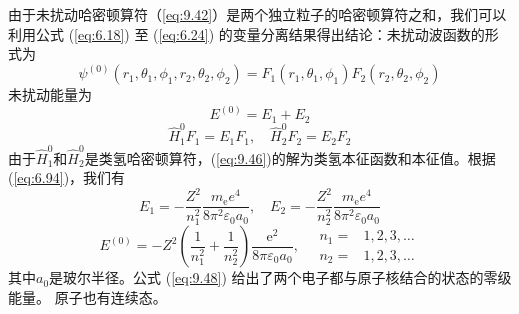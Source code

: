     由于未扰动哈密顿算符（\ref{eq:9.42}）是两个独立粒子的哈密顿算符之和，我们可以利用公式 (\ref{eq:6.18}) 至 (\ref{eq:6.24}) 的变量分离结果得出结论：未扰动波函数的形式为
    \begin{equation}
        \psi^{\left(0\right)}\left(r_1,\theta_1,\phi_1,r_2,\theta_2,\phi_2\right) = F_1\left(r_1,\theta_1,\phi_1\right) F_2\left(r_2,\theta_2,\phi_2\right)
        \label{eq:9.44}
    \end{equation}
    未扰动能量为
    \begin{equation}
        E^{\left(0\right)} = E_1 + E_2
        \label{eq:9.45}
    \end{equation}
    \begin{equation}
        \hat{H}_1^0 F_1 = E_1 F_1, \quad \hat{H}_2^0 F_2 = E_2 F_2
        \label{eq:9.46}
    \end{equation}
    由于$\hat{H}_1^0$和$\hat{H}_2^0$是类氢哈密顿算符，(\ref{eq:9.46})的解为类氢本征函数和本征值。根据(\ref{eq:6.94})，我们有
    \begin{equation}
        E_1 = -\frac{Z^2}{n_1^2}\frac{m_{\mathrm{e}}e^4}{8\pi^2\varepsilon_0a_0}, \quad E_2 = -\frac{Z^2}{n_2^2}\frac{m_{\mathrm{e}}e^4}{8\pi^2\varepsilon_0a_0}
        \label{eq:9.47}
    \end{equation}
    \begin{equation}
        E^{\left(0\right)} = -Z^2\left(\frac{1}{n_1^2} + \frac{1}{n_2^2}\right)\frac{\mathrm{e}^2}{8\pi\varepsilon_0a_0}, \quad \begin{aligned}
            n_1 = & 1, 2, 3, \ldots \\
            n_2 = & 1, 2, 3, \ldots
        \end{aligned}
        \label{eq:9.48}
    \end{equation}
    其中$a_0$是玻尔半径。公式 (\ref{eq:9.48}) 给出了两个电子都与原子核结合的状态的零级能量。 原子也有连续态。

